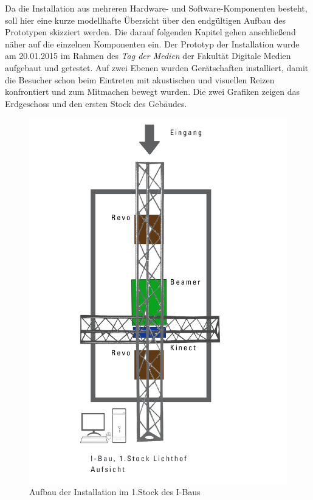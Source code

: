 Da die Installation aus mehreren Hardware- und Software-Komponenten besteht, soll hier eine kurze modellhafte Übersicht über den endgültigen Aufbau des Prototypen skizziert werden. Die darauf folgenden Kapitel gehen anschließend näher auf die einzelnen Komponenten ein. Der Prototyp der Installation wurde am 20.01.2015 im Rahmen des \textit{Tag der Medien} der Fakultät Digitale Medien aufgebaut und getestet. Auf zwei Ebenen wurden Gerätschaften installiert, damit die Besucher schon beim Eintreten mit akustischen und visuellen Reizen konfrontiert und zum Mitmachen bewegt wurden. Die zwei Grafiken zeigen das Erdgeschoss und den ersten Stock des Gebäudes.
\begin{figure}[htbp]
	\centering
		\includegraphics[width=1.0\textwidth]{images/ModelFirstFloor.png}
	\caption{Aufbau der Installation im 1.Stock des I-Baus}
	\label{fig:ModelFF}
\end{figure}

